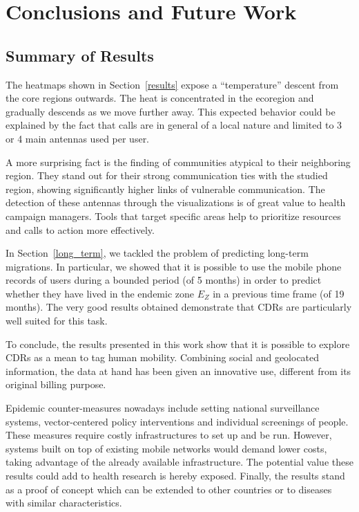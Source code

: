 
\section{Conclusions and Future Work}

\subsection{Summary of Results}

The heatmaps shown in Section~\ref{results} expose a ``temperature'' descent from the core regions outwards. The heat is concentrated in the ecoregion and gradually descends as we move further away. This expected behavior could be explained by the fact that calls are in general of a local nature and limited to 3 or 4 main antennas used per user. 

A more surprising fact is the finding of communities atypical to their neighboring region. They stand out for their strong communication ties with the studied region, showing significantly higher links of vulnerable communication. The detection of these antennas through the visualizations is of great value to health campaign managers. Tools that target specific areas help to prioritize resources and calls to action more effectively.

In Section~\ref{long_term}, we tackled the problem of predicting long-term migrations. In particular, we showed that it is possible to use the mobile phone records of users during a bounded period (of 5 months) in order to predict whether they have lived in the endemic zone $E_Z$ in a previous time frame (of 19 months).
The very good results obtained demonstrate that CDRs are particularly well suited for this task.

To conclude, the results presented in this work show that it is possible to explore CDRs as a mean to tag human mobility. Combining social and geolocated information, the data at hand has been given an innovative use, different from its original billing purpose.

Epidemic counter-measures nowadays include setting national surveillance systems, vector-centered policy interventions and individual screenings of people. These measures require costly infrastructures to set up and be run. However, systems built on top of existing mobile networks would demand lower costs, taking advantage of the already available infrastructure. The potential value these results could add to health research is hereby exposed.
Finally, the results stand as a proof of concept which can be extended to other countries or to diseases with similar characteristics.



